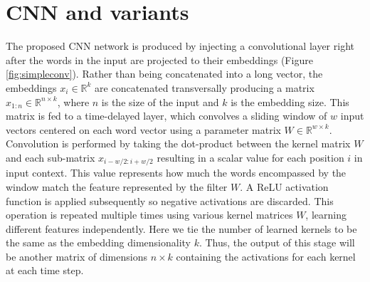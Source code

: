 \section{CNN and variants}

The proposed CNN network is produced by injecting a convolutional layer right after the words in the input are projected to their embeddings (Figure \ref{fig:simpleconv}). Rather than being concatenated into a long vector, the embeddings $x_i \in \mathbb{R}^k$ are concatenated transversally producing a matrix $x_{1:n}  \in \mathbb{R}^{n \times k}$, where $n$ is the size of the input and $k$ is the embedding size.  %
%
This matrix is fed to a time-delayed layer, which convolves a
sliding window of $w$ input vectors centered on each word vector using a
parameter matrix $W \in \mathbb{R}^{w \times k}$. Convolution is performed
by taking the dot-product between the kernel matrix $W$ and each
sub-matrix $x_{i-w/2:i+w/2}$ resulting in a scalar value for each position $i$ in input context. This value represents how much the words encompassed by the window  match the feature represented by the filter $W$. A ReLU activation function is applied subsequently so negative activations are discarded. %
This  operation is repeated multiple times using
various kernel matrices $W$,  learning different features independently. Here we tie the number of learned kernels to be the same as the embedding dimensionality $k$. Thus, the output of this stage will be another matrix of dimensions $n \times k$ containing the activations for each kernel at each time step.


